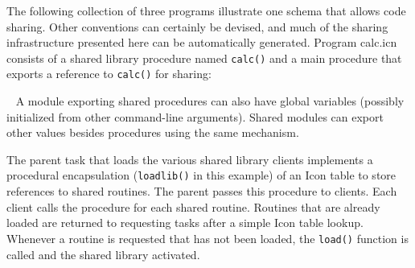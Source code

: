 The following collection of three programs illustrate one schema that allows
code sharing. Other conventions can certainly be devised, and much of the
sharing infrastructure presented here can be automatically generated. Program
calc.icn consists of a shared library procedure named {\texttt{calc()}} and a
main procedure that exports a reference to {\texttt{calc()}} for sharing:


\medskip{}\ {\sffamily
A module exporting shared procedures can also have global
variables (possibly initialized from other command-line arguments).
Shared modules can export other values besides procedures using the
same mechanism.}\medskip

The parent task that loads the various shared library clients implements
a procedural encapsulation ({\texttt{loadlib()}} in
this example) of an Icon table to store references to shared routines.
The parent passes this procedure to clients. Each client calls the
procedure for each shared routine. Routines that are already loaded are
returned to requesting tasks after a simple Icon table lookup. Whenever
a routine is requested that has not been loaded, the
{\texttt{load()}} function is called and the shared
library activated.


